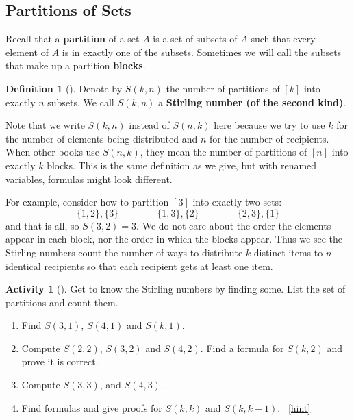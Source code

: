 \documentclass[10pt,]{book}
\newcommand{\terminology}[1]{\textbf{#1}}
\theoremstyle{plain}
\theoremstyle{definition}
\newtheorem{definition}[theorem]{Definition}
\theoremstyle{definition}
\theoremstyle{definition}
\newtheorem{activity}[project]{Activity}
\numberwithin{equation}{chapter}
\begin{document}
\subsection[{Partitions of Sets}]{Partitions of Sets}\label{subsection-24}
\hypertarget{p-1076}{}%
Recall that a \terminology{partition} of a set \(A\) is a set of subsets of \(A\) such that every element of \(A\) is in exactly one of the subsets.  Sometimes we will call the subsets that make up a partition \terminology{blocks}.%
\begin{definition}[{}]\label{def-stirling}
\hypertarget{p-1077}{}%
Denote by \(S(k,n)\) the number of partitions of \([k]\) into exactly \(n\) subsets.  We call \(S(k,n)\) a \terminology{Stirling number (of the second kind)}.%
\end{definition}
\hypertarget{p-1078}{}%
Note that we write \(S(k,n)\) instead of \(S(n,k)\) here because we try to use \(k\) for the number of elements being distributed and \(n\) for the number of recipients.  When other books use \(S(n,k)\), they mean the number of partitions of \([n]\) into exactly \(k\) blocks.  This is the same definition as we give, but with renamed variables, formulas might look different.%
\par
\hypertarget{p-1079}{}%
For example, consider how to partition \([3]\) into exactly two sets:%
\begin{equation*}
\{1,2\}, \{3\} \qquad \qquad \{1,3\},\{2\} \qquad \qquad \{2,3\},\{1\}
\end{equation*}
and that is all, so \(S(3,2) = 3\).  We do not care about the order the elements appear in each block, nor the order in which the blocks appear.  Thus we see the Stirling numbers count the number of ways to distribute \(k\) distinct items to \(n\) identical recipients so that each recipient gets at least one item.%
\begin{activity}[]\label{act_stirlingcomputations}
\hypertarget{p-1080}{}%
Get to know the Stirling numbers by finding some.  List the set of partitions and count them.%
\begin{enumerate}[font=\bfseries,label=(\alph*),ref=\alph*]
\item\label{task-209} \hypertarget{p-1081}{}%
Find \(S(3,1)\), \(S(4,1)\) and \(S(k,1)\).%
\item\label{task-210} \hypertarget{p-1082}{}%
Compute \(S(2,2)\), \(S(3,2)\) and \(S(4,2)\).  Find a formula for \(S(k,2)\) and prove it is correct.%
\item\label{task-211} \hypertarget{p-1083}{}%
Compute \(S(3,3)\), and \(S(4,3)\).%
\item\label{task-212} \hypertarget{p-1084}{}%
Find formulas and give proofs for \(S(k,k)\) and \(S(k,k - 1)\).%
~\hfill{\tiny\hyperlink{a-198.d}{[hint]}\hypertarget{q-198.d}{}}\end{enumerate}
\end{activity}
\end{document}
